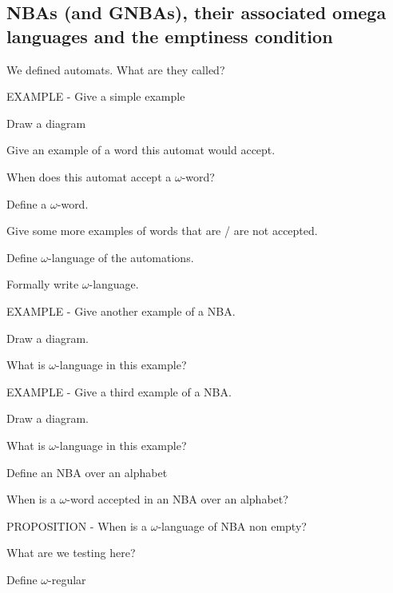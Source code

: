 \documentclass[fleqn]{article}
\begin{document}
\subsection{NBAs (and GNBAs), their associated omega languages and the emptiness condition}
\begin{enumerate}
    \item We defined automats. What are they called?
    {\color{red}\item EXAMPLE - Give a simple example}
    \begin{itemize}
        {\color{red}\item Draw a diagram}
        {\color{red}\item Give an example of a word this automat would accept.}
        {\color{red}\item When does this automat accept a $\omega$-word?}
        {\color{red}\item Define a $\omega$-word.}
        {\color{red}\item Give some more examples of words that are / are not accepted.}
        {\color{red}\item Define $\omega$-language of the automations.}
        {\color{red}\item Formally write $\omega$-language.}
    \end{itemize}
    \item EXAMPLE - Give another example of a NBA.
    \begin{itemize}
        {\color{red}\item Draw a diagram.}
        {\color{red}\item What is $\omega$-language in this example?}
    \end{itemize}
    \item EXAMPLE - Give a third example of a NBA.
    \begin{itemize}
        {\color{red}\item Draw a diagram.}
        {\color{red}\item What is $\omega$-language in this example?}
    \end{itemize}
    {\color{red}\item Define an NBA over an alphabet}
    {\color{red}\item When is a $\omega$-word accepted in an NBA over an alphabet?}
    {\color{red}\item PROPOSITION - When is a $\omega$-language of NBA non empty?}
    {\color{red}\item What are we testing here?}
    {\color{red}\item Define $\omega$-regular }

\end{enumerate}
\end{document}
